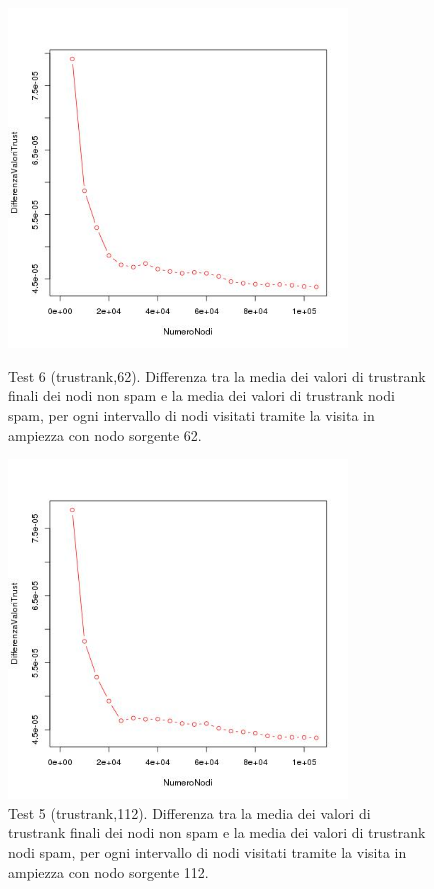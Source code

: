 \begin{figure}
 \centering
 \includegraphics[height=9cm]{immagini/test6/averageCompleteTest_trust_62}
  \caption{Test 6 (trustrank,62). Differenza tra la media dei valori di trustrank finali dei nodi non spam e la media dei valori di trustrank nodi spam, per ogni intervallo di nodi visitati tramite la visita in ampiezza con nodo sorgente 62.}
 \label{fig:test6trust62}
  \centering
 \includegraphics[height=9cm]{immagini/test6/averageCompleteTest_trust_112}
  \caption{Test 5 (trustrank,112). Differenza tra la media dei valori di trustrank finali dei nodi non spam e la media dei valori di trustrank nodi spam, per ogni intervallo di nodi visitati tramite la visita in ampiezza con nodo sorgente 112.}
 \label{fig:test6trust112}
\end{figure} 
